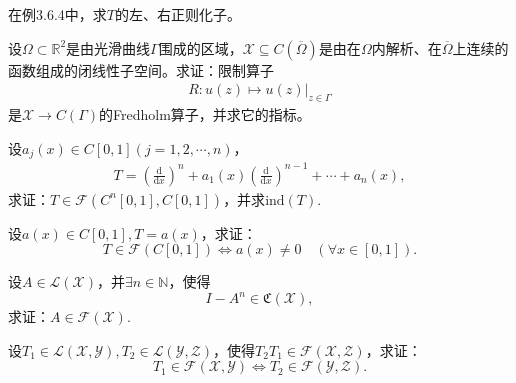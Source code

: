 \documentclass[../../main.tex]{subfiles}%
\begin{document}
\begin{example}
在例3.6.4中，求$T$的左、右正则化子。
\end{example}

\begin{example}
设$\Omega\subset\mathbb{R}^{2}$是由光滑曲线$\Gamma$围成的区域，$\mathscr{X}\subseteq C(\overline{\Omega})$是由在$\Omega$内解析、在$\overline{\Omega}$上连续的函数组成的闭线性子空间。求证：限制算子
\begin{align*}
R:u(z)\mapsto u(z)\big|_{z\in\Gamma}
\end{align*}
是$\mathscr{X}\to C(\Gamma)$的Fredholm算子，并求它的指标。
\end{example}

\begin{example}
设$a_{j}(x)\in C[0,1](j=1,2,\cdots,n)$，
\begin{align*}
T=\left(\frac{\mathrm{d}}{\mathrm{d}x}\right)^{n}+a_{1}(x)\left(\frac{\mathrm{d}}{\mathrm{d}x}\right)^{n-1}+\cdots+a_{n}(x),
\end{align*}
求证：$T\in\mathscr{F}(C^{n}[0,1],C[0,1])$，并求$\mathrm{ind}(T)$.
\end{example}

\begin{example}
设$a(x)\in C[0,1],T=a(x)$，求证：
$$T\in\mathscr{F}(C[0,1])\iff a(x)\neq0\quad(\forall x\in[0,1]).$$
\end{example}

\begin{example}
设$A\in\mathscr{L}(\mathscr{X})$，并$\exists n\in\mathbb{N}$，使得
$$I-A^{n}\in\mathfrak{C}(\mathscr{X}),$$
求证：$A\in\mathscr{F}(\mathscr{X})$.
\end{example}

\begin{example}
设$T_{1}\in\mathscr{L}(\mathscr{X},\mathscr{Y}),T_{2}\in\mathscr{L}(\mathscr{Y},\mathscr{Z})$，使得$T_{2}T_{1}\in\mathscr{F}(\mathscr{X},\mathscr{Z})$，求证：
$$T_{1}\in\mathscr{F}(\mathscr{X},\mathscr{Y})\iff T_{2}\in\mathscr{F}(\mathscr{Y},\mathscr{Z}).$$
\end{example}
\end{document}
